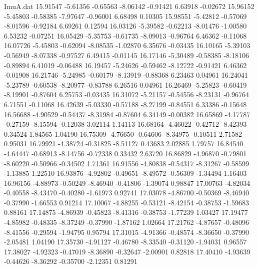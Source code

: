 \begin{filecontents}{ImuA.dat}
  15.91547   -5.61356   -0.65563   -8.06142   -0.91421    6.63918   -0.02672
  15.96152   -5.45803   -0.58385   -7.97647   -0.96001    6.68498    0.10305
  15.98551   -5.42812   -0.57069   -8.01596   -0.92184    6.69261    0.12594
  16.03126   -5.39582   -0.62213   -8.01476   -1.00580    6.53232   -0.07251
  16.05429   -5.35753   -0.61735   -8.09013   -0.96764    6.46362   -0.11068
  16.07726   -5.45803   -0.62094   -8.08535   -1.02870    6.35676   -0.03435
  16.10165   -5.39103   -0.56949   -8.07338   -0.97527    6.49415   -0.01145
  16.17146   -5.30489   -0.58385   -8.18106   -0.89894    6.41019   -0.06488
  16.19457   -5.24626   -0.59462   -8.12722   -0.91421    6.46362   -0.01908
  16.21746   -5.24985   -0.60179   -8.13919   -0.88368    6.23463    0.04961
  16.24041   -5.23789   -0.60538   -8.20977   -0.83788    6.26516    0.04961
  16.26469   -5.25823   -0.60419   -8.19901   -0.87604    6.25753   -0.03435
  16.31072   -5.21157   -0.54556   -8.23131   -0.96764    6.71551   -0.11068
  16.42639   -5.03330   -0.57188   -8.27199   -0.84551    6.33386   -0.15648
  16.56688   -4.90529   -0.54437   -8.31984   -0.87604    6.34149   -0.00382
  16.65869   -4.17787   -0.27159   -8.15594   -0.12038    3.02114    1.14113
  16.68164   -4.46022   -0.42712   -8.42393    0.34524    1.84565    1.04190
  16.75309   -4.76650   -0.64606   -8.34975   -0.10511    2.71582    0.95031
  16.79921   -4.38724   -0.31825   -8.51127    0.43683    2.02885    1.79757
  16.84540   -4.64447   -0.68913   -8.14756   -0.72338    0.33432    2.63720
  16.86829   -4.96870   -0.79801   -8.60220   -0.50966   -0.34502    1.71361
  16.91556   -4.80838   -0.54317   -8.31267   -0.58599   -1.13885    1.22510
  16.93876   -4.92802   -0.49651   -8.49572   -0.56309   -1.34494    1.16403
  16.96156   -4.88973   -0.50249   -8.46940   -0.41806   -1.39074    0.98847
  17.00763   -4.82034   -0.40558   -8.43470   -0.40280   -1.61973    0.92741
  17.03078   -4.86700   -0.50369   -8.46940   -0.37990   -1.66553    0.91214
  17.10067   -4.88255   -0.53121   -8.42154   -0.38753   -1.59683    0.88161
  17.14875   -4.86939   -0.45823   -8.41316   -0.38753   -1.77239    1.03427
  17.19477   -4.85982   -0.48335   -8.37249   -0.37990   -1.87162    1.02664
  17.21762   -4.87657   -0.48096   -8.41556   -0.29594   -1.94795    0.95794
  17.31015   -4.91366   -0.48574   -8.36650   -0.37990   -2.05481    1.04190
  17.35730   -4.91127   -0.46780   -8.33540   -0.31120   -1.94031    0.96557
  17.38027   -4.92323   -0.47019   -8.36890   -0.32647   -2.00901    0.82818
  17.40410   -4.93639   -0.44626   -8.36292   -0.35700   -2.12351    0.81291

\end{filecontents}
